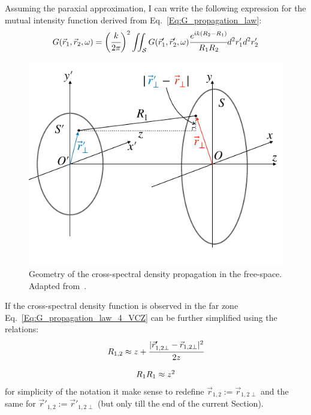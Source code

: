    Assuming the paraxial approximation, I can write the following expression for the mutual intensity function derived from Eq.~\ref{Eq:G_propagation_law}:
    \begin{align}
        G(\vec{r}_1, \vec{r}_2, \omega) = \bigg(\cfrac{k}{ 2 \pi} \bigg)^2 \iint_{\mathcal{S}} G(\vec{r}'_1, \vec{r}'_2, \omega) \cfrac{e^{i k (R_2 - R_1)}}{R_1 R_2}d^2r'_1 d^2r'_2
        \label{Eq:G_propagation_law_4_VCZ}
    \end{align}
    \begin{figure}[h!]
        \centering
        \includegraphics[width=0.5\linewidth]{content/images/Statistical_Optics/coh_prop_scheme_2.pdf}
        \captionsetup{justification=centering}
        \caption{Geometry of the cross-spectral density propagation in the free-space. Adapted from~.}
        \label{Fig:coh_prop_scheme_2}
    \end{figure}
    If the cross-spectral density function is observed in the far zone Eq.~\ref{Eq:G_propagation_law_4_VCZ} can be further simplified using the relations:
    \begin{align}
        \begin{array}{c}
            R_{1, 2}\approx  z + \cfrac{|\vec{r}'_{1, 2{\perp}} - \vec{r}_{1, 2{\perp}}|^2}{2z}\\
            \\
            R_{1}R_{1} \approx z^2
        \end{array}
        \label{Eq:R1R2_simp}
    \end{align}
    for simplicity of the notation it make sense to redefine $\vec{r}_{1, 2} :=\vec{r}_{1, 2{\perp}}$ and the same for $\vec{r}'_{1, 2} :=\vec{r}'_{1, 2{\perp}}$ (but only till the end of the current Section).

